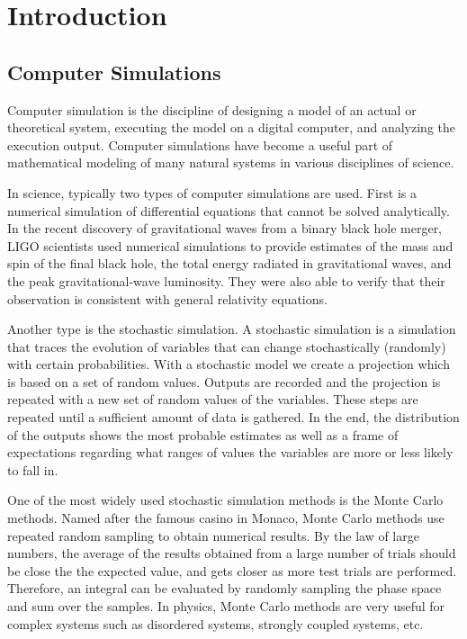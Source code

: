 \chapter{Introduction}
\section{Computer Simulations}
Computer simulation is the discipline of designing a model of an actual or 
theoretical system, executing the model on a digital computer, and 
analyzing the execution output. Computer simulations have become a useful part of mathematical modeling of 
many natural systems in various disciplines of science. 

In science, typically two types of computer simulations are used. First is a 
numerical simulation of differential equations that cannot be solved 
analytically. In the recent discovery of gravitational waves from a binary
black hole merger, LIGO scientists used numerical simulations to provide 
estimates of the mass and spin of the final black hole, the total energy 
radiated in gravitational waves, and the peak gravitational-wave luminosity.
They were also able to verify that their observation is consistent with general 
relativity equations.

Another type is the stochastic simulation. A stochastic simulation is a 
simulation that traces the evolution of variables that can change stochastically
 (randomly) with certain probabilities. With a stochastic model we create a 
projection which is based on a set of  random values. 
Outputs are recorded and the projection is repeated with a new 
set of random values of the variables. These steps are repeated until a 
sufficient amount of data is gathered. In the end, the distribution of the 
outputs shows the most probable estimates as well as a frame of expectations 
regarding what ranges of values the variables are more or less likely to fall 
in. 

One of the most widely used stochastic simulation methods is the Monte Carlo
methods. Named after the famous casino in Monaco, Monte Carlo methods use
repeated random sampling to obtain numerical results. By the law of large 
numbers, the average of the results obtained from a large number of trials
should be close the the expected value, and gets closer as more test trials
are performed. Therefore, an integral can be evaluated by randomly sampling
the phase space and sum over the samples. 
In physics, Monte Carlo methods are very useful for complex systems such as 
disordered systems, strongly coupled systems, etc. 

